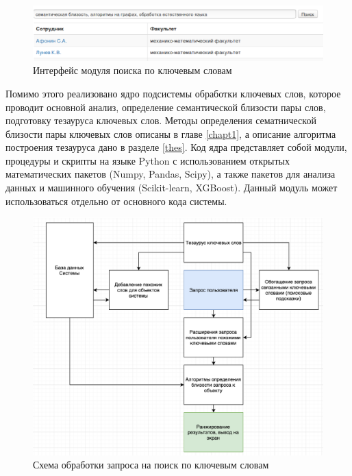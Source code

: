 \begin{figure}[ht]
  \begin{minipage}[ht]{1.0\linewidth}\centering
    \includegraphics[width=0.95\linewidth]{Dissertation/pics/search}
    \caption{Интерфейс модуля поиска по ключевым словам}
  \end{minipage}
  \label{img:search}
\end{figure}

Помимо этого реализовано ядро подсистемы обработки ключевых слов, которое проводит основной анализ, определение семантической близости пары слов, подготовку тезауруса ключевых слов. Методы определения сематнической близости пары ключевых слов описаны в главе \ref{chapt1}, а описание алгоритма построения тезауруса дано в разделе \ref{thes}. Код ядра представляет собой модули, процедуры и скрипты на языке Python с использованием открытых математических пакетов (Numpy, Pandas, Scipy), а также пакетов для анализа данных и машинного обучения (Scikit-learn, XGBoost). Данный модуль может использоваться отдельно от основного кода системы.

\begin{figure}[ht]
  \begin{minipage}[ht]{1.0\linewidth}\centering
    \includegraphics[width=0.95\linewidth]{Dissertation/pics/search_2}
    \caption{Схема обработки запроса на поиск по ключевым словам}
  \end{minipage}
  \label{img:search_2}
\end{figure}

